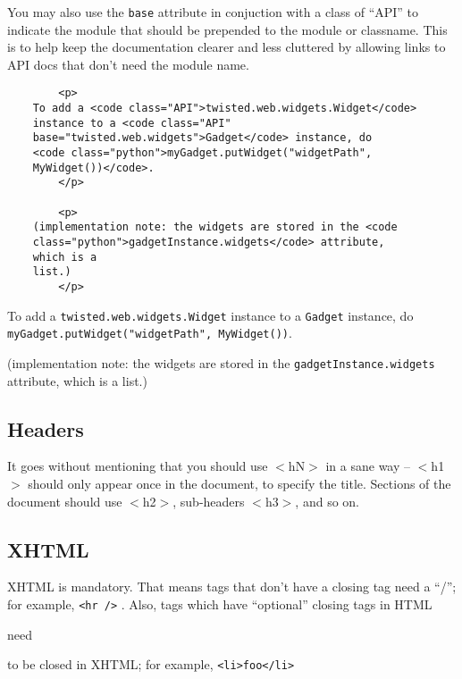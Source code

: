 You may also use the \texttt{base} attribute in conjuction     with a class of ``API'' to indicate the module that should be prepended     to the module or classname.  This is to help keep the documentation     clearer and less cluttered by allowing links to API docs that don't     need the module name.\begin{verbatim}
        <p>
    To add a <code class="API">twisted.web.widgets.Widget</code>
    instance to a <code class="API"
    base="twisted.web.widgets">Gadget</code> instance, do 
    <code class="python">myGadget.putWidget("widgetPath",
    MyWidget())</code>.  
        </p>
    
        <p> 
    (implementation note: the widgets are stored in the <code
    class="python">gadgetInstance.widgets</code> attribute,
    which is a
    list.)
        </p>
\end{verbatim}


     To add a \texttt{twisted.\linebreak[1]web.\linebreak[1]widgets.\linebreak[1]Widget}     instance to a \texttt{Gadget}     instance, do     \texttt{my\linebreak[1]Gadget.\linebreak[1]put\linebreak[1]Widget("widget\linebreak[1]Path", My\linebreak[1]Widget())}.         

     (implementation note: the widgets are stored in the \texttt{gadget\linebreak[1]Instance.\linebreak[1]widgets} attribute,     which is a     list.)         

\subsection{Headers}


It goes without mentioning that you should use $<$hN$>$ in     a sane way -- $<$h1$>$ should only appear once in the     document, to specify the title. Sections of the document should     use $<$h2$>$, sub-headers $<$h3$>$, and so on.

\subsection{XHTML}


XHTML is mandatory. That means tags that don't have a     closing tag need a ``/''; for example, \texttt{<hr />}     . Also, tags which have ``optional'' closing tags in HTML     \begin{em}need\end{em} to be closed in XHTML; for example,     \texttt{<li>foo</li>}

